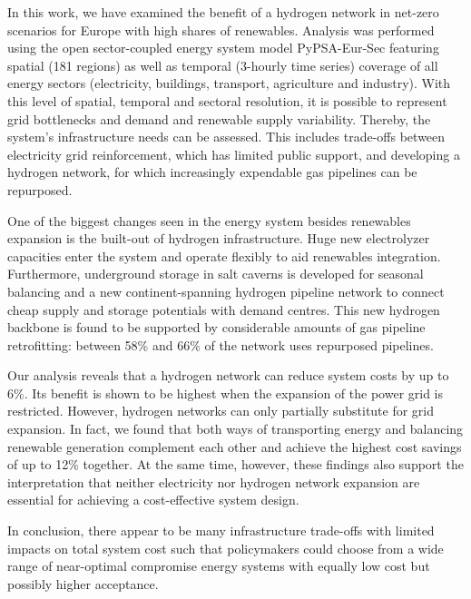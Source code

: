 In this work, we have examined the benefit of a hydrogen network in net-zero \co
scenarios for Europe with high shares of renewables. Analysis was performed
using the open sector-coupled energy system model PyPSA-Eur-Sec featuring
spatial (181 regions) as well as temporal (3-hourly time series) coverage of all
energy sectors (electricity, buildings, transport, agriculture and industry).
With this level of spatial, temporal and sectoral resolution, it is possible to
represent grid bottlenecks and demand and renewable supply variability. Thereby,
the system's infrastructure needs can be assessed. This includes trade-offs
between electricity grid reinforcement, which has limited public support, and
developing a hydrogen network, for which increasingly expendable gas pipelines
can be repurposed.

One of the biggest changes seen in the energy system besides renewables
expansion is the built-out of hydrogen infrastructure. Huge new electrolyzer
capacities enter the system and operate flexibly to aid renewables integration.
Furthermore, underground storage in salt caverns is developed for seasonal
balancing and a new continent-spanning hydrogen pipeline network to connect
cheap supply and storage potentials with demand centres. This new hydrogen
backbone is found to be supported by considerable amounts of gas pipeline
retrofitting: between 58\% and 66\% of the network uses repurposed pipelines.

Our analysis reveals that a hydrogen network can reduce system costs by up to
6\%. Its benefit is shown to be highest when the expansion of the power grid is
restricted. However, hydrogen networks can only partially substitute for grid
expansion.  In fact, we found that both ways of transporting energy and balancing
renewable generation complement each other and achieve the highest cost savings
of up to 12\% together. At the same time, however, these findings also support
the interpretation that neither electricity nor hydrogen network expansion are
essential for achieving a cost-effective system design.

In conclusion, there appear to be many infrastructure trade-offs with limited
impacts on total system cost such that policymakers could choose from a wide
range of near-optimal compromise energy systems with equally low cost but
possibly higher acceptance.

